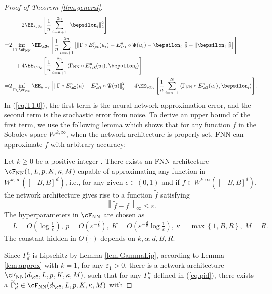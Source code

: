 \documentclass[11pt]{article} %
\begin{document}
\begin{proof}[Proof of Theorem \ref{thm.general}]
\begin{align}
 	&\quad - 2\EE_{\cS_2}\left[\frac{1}{n}\sum_{i=n+1}^{2n}\|\bepsilon_i\|_{2}^2\right] \nonumber \\
 	=&2\inf_{\Gamma\in \cF_{\rm NN}}\EE_{\cS_2}\left[\frac{1}{n}\sum_{i=n+1}^{2n}\left[\| \Gamma \circ E_{\cX}^n(u_i)- E_{\cY}^n\circ\Psi(u_i)-\bepsilon_i\|_{2}^2-\|\bepsilon_i\|_{2}^2\right] \right]\nonumber\\
 	&\quad +4\EE_{\cS_2}\left[\frac{1}{n}\sum_{i=n+1}^{2n}\left\langle \Gamma_{\rm NN} \circ E_{\cX}^n(u_i), \bepsilon_i\right\rangle \right] \nonumber \\
 	=&2\inf_{\Gamma\in \cF_{\rm NN}}\EE_{u\sim \gamma}\left[ \left\| \Gamma \circ E_{\cX}^n(u)- E_{\cY}^n\circ\Psi(u)\right\|_{2}^2 \right]+4\EE_{\cS_2}\left[\frac{1}{n}\sum_{i=n+1}^{2n}\left\langle \Gamma_{\rm NN} \circ E_{\cX}^n(u_i), \bepsilon_i\right\rangle \right].
 	\label{eq.T1.0}
 \end{align}
 In (\ref{eq.T1.0}), the first term is the neural network approximation error, and the second term is the stochastic error from noise. To derive an upper bound of the first term, we use the following lemma which shows that for any function $f$ in the Sobolev space $W^{k,\infty}$,  when the network architecture is properly set, FNN can approximate $f$ with arbitrary accuracy:
 \begin{lemma}
 	\label{lem.approx}
 	Let $k\geq 0$ be a positive integer . There exists an FNN architecture $\cF_{\rm NN}(1,L,p,K,\kappa,M)$ capable of approximating any function in $W^{k,\infty}\left([-B,B]^d\right)$, i.e., for any given $\epsilon\in (0,1)$ and if $f\in W^{k,\infty}\left([-B,B]^d\right)$, the network architecture gives rise to a function $\tilde{f}$ satisfying 
 	$$
 	\left\|\widetilde{f}-f\right\|_{\infty}\leq\varepsilon.
 	$$
 	The hyperparameters in $\cF_{\rm NN}$ are chosen as
 	\begin{align*}
 		&L=O\left(\log \frac{1}{\varepsilon}\right), \ p=O\left(\varepsilon^{-\frac{d}{k}}\right),\ K=O\left(\varepsilon^{-\frac{d}{k}}\log \frac{1}{\varepsilon}\right), \ \kappa=\max\left\{1,B,R \right\},\ M=R.
 	\end{align*}
 	The constant hidden in $O(\cdot)$ depends on $k,\alpha,d,B,R$.
 \end{lemma}
 Since $\Gamma_d^n$ is Lipschitz by Lemma \ref{lem.GammaLip}, according to Lemma \ref{lem.approx} with $k=1$, for any $\varepsilon_1>0$, there is a network architecture $\cF_{\rm NN}(d_{\cY},L,p,K,\kappa,M)$, such that for any  $\Gamma_{d}^n$ defined in (\ref{eq.pid}), there exists a $\widetilde{\Gamma}_d^n\in \cF_{\rm NN}(d_{\cY},L,p,K,\kappa,M)$ with

\end{proof}
\end{document}
